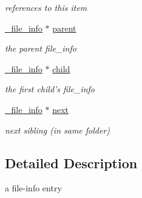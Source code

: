 \begin{CompactItemize}
\begin{CompactList}\small\item\em references to this item \item\end{CompactList}\item 
\hypertarget{struct__file__info_o13}{
\hyperlink{struct__file__info}{\_\-file\_\-info} $\ast$ \hyperlink{struct__file__info_o13}{parent}}
\label{struct__file__info_o13}

\begin{CompactList}\small\item\em the parent file\_\-info \item\end{CompactList}\item 
\hypertarget{struct__file__info_o14}{
\hyperlink{struct__file__info}{\_\-file\_\-info} $\ast$ \hyperlink{struct__file__info_o14}{child}}
\label{struct__file__info_o14}

\begin{CompactList}\small\item\em the first child's file\_\-info \item\end{CompactList}\item 
\hypertarget{struct__file__info_o15}{
\hyperlink{struct__file__info}{\_\-file\_\-info} $\ast$ \hyperlink{struct__file__info_o15}{next}}
\label{struct__file__info_o15}

\begin{CompactList}\small\item\em next sibling (in same folder) \item\end{CompactList}\end{CompactItemize}


\subsection{Detailed Description}
a file-info entry 

